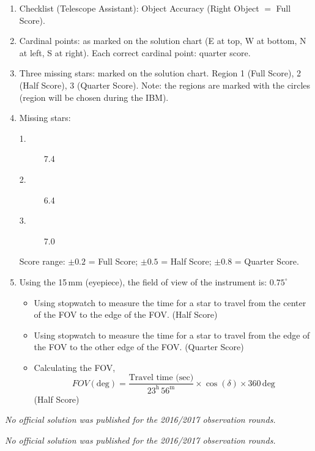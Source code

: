 \begin{enumerate}
\item Checklist (Telescope Assistant): Object Accuracy (Right Object $=$
Full Score).

\item Cardinal points: as marked on the solution chart (E at top, W at
bottom, N at left, S at right). Each correct cardinal point: quarter score.

\item Three missing stars: marked on the solution chart. Region 1 (Full
Score), 2 (Half Score), 3 (Quarter Score). Note: the regions are marked
with the circles (region will be chosen during the IBM).


\item Missing stars:
\begin{description}
\item[1.] 7.4
\item[2.] 6.4
\item[3.] 7.0
\end{description}
Score range: $\pm 0.2$ = Full Score; $\pm 0.5$ = Half Score;
$\pm 0.8$ = Quarter Score.

\item Using the 15\,mm (eyepiece), the field of view of the instrument is:
$0.75^\circ$
\begin{itemize}
\item Using stopwatch to measure the time for a star to travel from the
  center of the FOV to the edge of the FOV. \hfill(Half Score)
\item Using stopwatch to measure the time for a star to travel from the
  edge of the FOV to the other edge of the FOV. \hfill(Quarter Score)
\item Calculating the FOV,
\[ FOV(\mathrm{deg}) = \frac{\text{Travel time (sec)}}{23^{\mathrm{h}}\,56^{\mathrm{m}}}
   \times \cos(\delta) \times 360\,\mathrm{deg} \]
\hfill(Half Score)
\end{itemize}
\end{enumerate}

\textit{No official solution was published for the 2016/2017 observation rounds.}

\textit{No official solution was published for the 2016/2017 observation rounds.}

